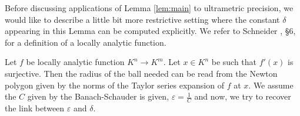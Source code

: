 \documentclass{amsart}
\begin{document}

Before discussing applications of Lemma \ref{lem:main} to ultrametric 
precision, we would like to describe a little bit more restrictive 
setting where the constant $\delta$ appearing in this Lemma can be 
computed explicitly.
We refer to Schneider \cite{Schneider}, \S 6, for a definition of a 
locally analytic function.

\begin{rmk}
Let $f$ be locally analytic function $K^n \rightarrow K^m$. Let $x \in K^n$ be such that $f'(x)$ is surjective. Then the radius of the ball needed can be read from the Newton polygon given by the norms of the Taylor series expansion of $f$ at $x$. We assume the $C$ given by the Banach-Schauder is given, $\varepsilon = \frac{1}{C}$ and now, we try to recover the link between $\varepsilon$ and $\delta$.
\end{rmk}
\end{document}
